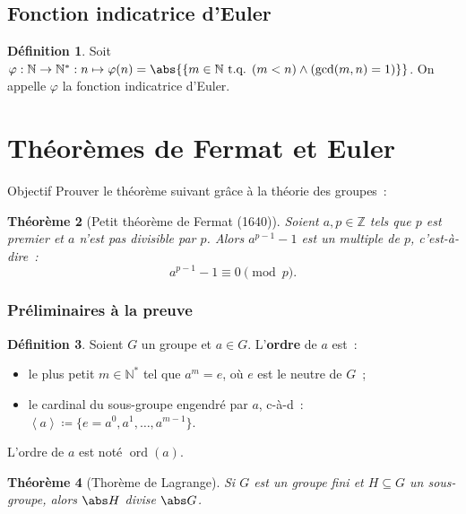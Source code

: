 \documentclass[10pt, mathserif]{beamer}
\DeclareMathOperator{\ord}{ord}
\newcommand{\tq}{\text{ t.q. }}
\newcommand{\Z}{\mathbb Z}
\newcommand{\N}{\mathbb N}
\newcommand{\eng}[1]{\left\langle#1\right\rangle}
\newtheorem{thm}{Théorème}[section]
\newtheorem{lem}[thm]{Lemme}
\theoremstyle{definition}
\newtheorem{déf}[thm]{Définition}
\theoremstyle{remark}
\begin{document}
	\subsection{Fonction indicatrice d'Euler}
	\begin{frame}
		\begin{déf}
			Soit $\varphi : \N \to \N^* : n \mapsto \varphi(n) = \abs {\left\{m \in \N \tq (m < n) \land (\gcd(m, n) = 1)\right\}}$. On appelle $\varphi$ la fonction
			indicatrice d'Euler.
		\end{déf}

	\end{frame}
	
\section{Théorèmes de Fermat et Euler}
	\begin{frame}
		\begin{block}{Objectif}
			Prouver le théorème suivant grâce à la théorie des groupes~:
		\end{block}

		\begin{thm}[Petit théorème de Fermat (1640)]
			Soient $a, p \in\Z$ tels que $p$ est premier et $a$ n'est pas divisible par $p$. Alors $a^{p-1} - 1$ est un multiple de $p$, c'est-à-dire~:
			\[a^{p-1}-1 \equiv 0 \pmod p.\]
		\end{thm}
	\end{frame}

	\begin{frame}
		\frametitle{Préliminaires à la preuve}
		\begin{déf}
			Soient $G$ un groupe et $a \in G$. L'\textbf{ordre} de $a$ est~:
			\begin{itemize}
				\item le plus petit $m \in \N^*$ tel que $a^m = e$, où $e$ est le neutre de $G$~;
				\item le cardinal du sous-groupe engendré par $a$, c-à-d~: $\eng a \coloneqq \{e = a^0, a^1, \dotsc, a^{m-1}\}$.
			\end{itemize}

			L'ordre de $a$ est noté $\ord(a)$.
		\end{déf}

		\begin{thm}[Thorème de Lagrange]
			Si $G$ est un groupe fini et $H \subseteq G$ un sous-groupe, alors $\abs H$ divise $\abs G$.
		\end{thm}
	\end{frame}
\end{document}
